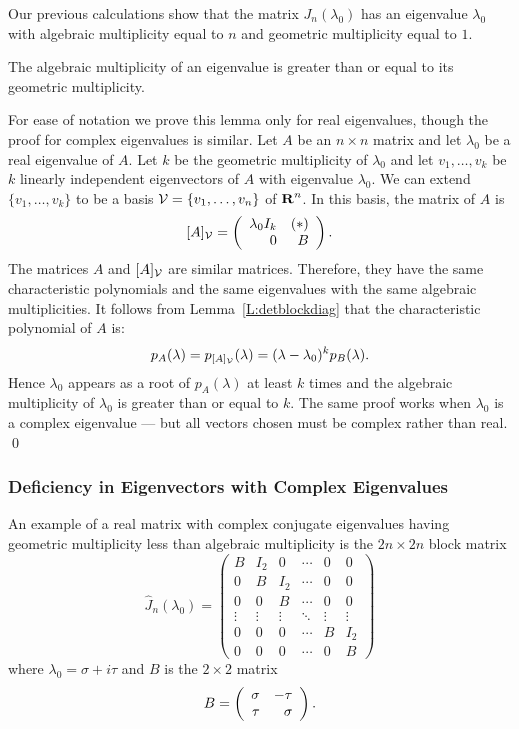 Our previous calculations show that the matrix $J_n(\lambda_0)$
has an eigenvalue $\lambda_0$ with algebraic multiplicity equal
to $n$ and geometric multiplicity equal to $1$.

\begin{lemma} 
The algebraic multiplicity of an eigenvalue is greater than 
or equal to its geometric multiplicity.
\end{lemma}

\proof For ease of notation we prove this lemma only for real 
eigenvalues, though the proof for complex eigenvalues is similar.  Let 
$A$ be an $n\times n$ matrix and let $\lambda_0$ be a real eigenvalue 
of $A$. Let $k$ be the geometric multiplicity of $\lambda_0$ and let 
$v_1,\ldots,v_k$ be $k$ linearly independent eigenvectors of $A$ with 
eigenvalue $\lambda_0$.   We can extend $\{v_1,\ldots,v_k\}$ to be a basis
${\cal V} = \{v_1,\ldots,v_n\}$ of $\mbox{$\bf{R}$}^n$.  In this basis, the matrix
of $A$ is 
\[
[A]_{\cal V} = \left(\begin{array}{rr} \lambda_0 I_k & (*)\\ 0 &B\end{array}\right).
\]
The matrices $A$ and $[A]_{\cal V}$ are similar matrices. Therefore,
they have the same 
characteristic polynomials
and the same eigenvalues 
with the same algebraic multiplicities.  It follows from 
Lemma~\ref{L:detblockdiag} that the characteristic polynomial of $A$ is:
\[
p_A(\lambda) = p_{[A]_{\cal V}}(\lambda) = (\lambda-\lambda_0)^kp_B(\lambda).
\]
Hence $\lambda_0$ appears as a root of $p_A(\lambda)$ at least 
$k$ times and the algebraic multiplicity of $\lambda_0$ 
is greater than or equal to $k$.   The same proof works when $\lambda_0$ 
is a complex eigenvalue --- but all vectors chosen must be complex rather
than real.   \qed

\subsubsection*{Deficiency in Eigenvectors with Complex Eigenvalues}

An example of a real matrix with complex conjugate eigenvalues having 
geometric multiplicity less than algebraic multiplicity is the 
$2n \times 2n$ block matrix
\begin{equation} \label{E:JnC}
\widehat{J}_n(\lambda_0)=
\left(\begin{array}{cccccc} B & I_2 & 0 & \cdots & 0 & 0\\
	0 & B & I_2 & \cdots & 0 & 0 \\
	0 & 0 & B  & \cdots & 0 & 0\\
	\vdots & \vdots & \vdots & \ddots & \vdots & \vdots\\
	0 & 0 & 0 & \cdots & B & I_2 \\
	0 & 0 & 0 & \cdots & 0 & B \end{array}\right)
\end{equation}
where $\lambda_0=\sigma+i\tau$ and $B$ is the $2\times 2$ matrix
\[
B = \left(\begin{array}{rr} \sigma & -\tau\\ \tau &\sigma\end{array}\right).
\]

